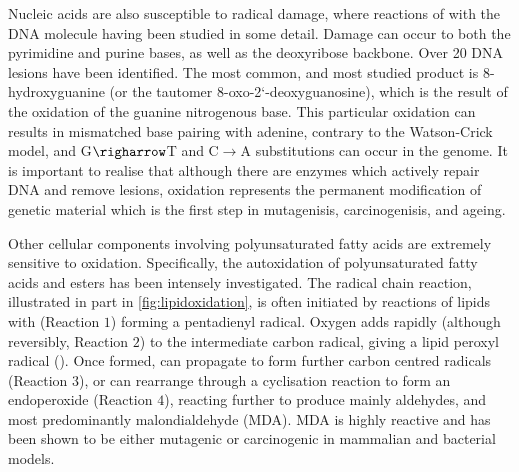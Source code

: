 Nucleic acids are also susceptible to radical
damage,\cite{Halliwell2015,Valko2007} where reactions of  with the DNA
molecule having been studied in some detail. Damage can occur to both the
pyrimidine and purine bases, as well as the deoxyribose backbone. Over 20 DNA
lesions have been identified.\cite{Dizdaroglu1992,Cooke2003} The most common,
and most studied product is 8-hydroxyguanine (or the tautomer
8-oxo-2`-deoxyguanosine), which is the result of the oxidation of the guanine
nitrogenous base. This particular oxidation can results in mismatched base
pairing with adenine, contrary to the Watson-Crick model, and G$\righarrow$T and
C$\rightarrow$A substitutions can occur in the genome.\cite{Cheng1992} It is
important to realise that although there are enzymes which actively repair DNA
and remove lesions,\cite{Friedberg2005} oxidation represents the permanent
modification of genetic material which is the first step in mutagenisis,
carcinogenisis, and ageing.


Other cellular components involving polyunsaturated fatty acids are extremely
sensitive to oxidation. Specifically, the autoxidation of polyunsaturated fatty
acids and esters has been intensely
investigated.\cite{Marnett2000,Sevanian2000,Pratt2003,Spiteller2007,Ayala2014}
The radical chain reaction, illustrated in part in \ref{fig:lipidoxidation}, is
often initiated by reactions of lipids with  (Reaction $1$) forming a
pentadienyl radical. Oxygen adds rapidly (although reversibly, Reaction $2$) to
the intermediate carbon radical,\cite{Pratt2003} giving a lipid peroxyl radical
(). Once formed,  can propagate to form further carbon
centred radicals (Reaction $3$), or can rearrange through a cyclisation reaction
to form an endoperoxide (Reaction $4$), reacting further to produce mainly
aldehydes, and most predominantly malondialdehyde (MDA).\cite{Valko2007} MDA is
highly reactive and has been shown to be either mutagenic or carcinogenic in
mammalian and bacterial models.\cite{Marnett2000}

